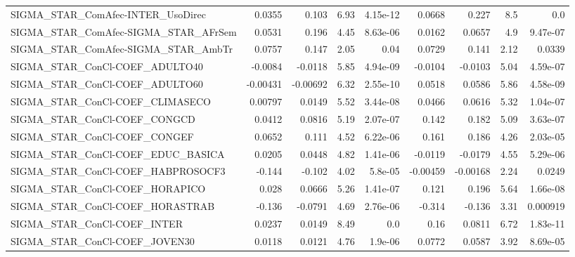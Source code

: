 \begin{tabular}{lrrrrrrrr}
SIGMA\_STAR\_ComAfec-INTER\_UsoDirec      &      0.0355 &        0.103 &     6.93 & 4.15e-12 &     0.0668 &       0.227 &          8.5 &           0.0 \\
SIGMA\_STAR\_ComAfec-SIGMA\_STAR\_AFrSem   &      0.0531 &        0.196 &     4.45 & 8.63e-06 &     0.0162 &      0.0657 &          4.9 &      9.47e-07 \\
SIGMA\_STAR\_ComAfec-SIGMA\_STAR\_AmbTr    &      0.0757 &        0.147 &     2.05 &     0.04 &     0.0729 &       0.141 &         2.12 &        0.0339 \\
SIGMA\_STAR\_ConCl-COEF\_ADULTO40         &     -0.0084 &      -0.0118 &     5.85 & 4.94e-09 &    -0.0104 &     -0.0103 &         5.04 &      4.59e-07 \\
SIGMA\_STAR\_ConCl-COEF\_ADULTO60         &    -0.00431 &     -0.00692 &     6.32 & 2.55e-10 &     0.0518 &      0.0586 &         5.86 &      4.58e-09 \\
SIGMA\_STAR\_ConCl-COEF\_CLIMASECO        &     0.00797 &       0.0149 &     5.52 & 3.44e-08 &     0.0466 &      0.0616 &         5.32 &      1.04e-07 \\
SIGMA\_STAR\_ConCl-COEF\_CONGCD           &      0.0412 &       0.0816 &     5.19 & 2.07e-07 &      0.142 &       0.182 &         5.09 &      3.63e-07 \\
SIGMA\_STAR\_ConCl-COEF\_CONGEF           &      0.0652 &        0.111 &     4.52 & 6.22e-06 &      0.161 &       0.186 &         4.26 &      2.03e-05 \\
SIGMA\_STAR\_ConCl-COEF\_EDUC\_BASICA      &      0.0205 &       0.0448 &     4.82 & 1.41e-06 &    -0.0119 &     -0.0179 &         4.55 &      5.29e-06 \\
SIGMA\_STAR\_ConCl-COEF\_HABPROSOCF3      &      -0.144 &       -0.102 &     4.02 &  5.8e-05 &   -0.00459 &    -0.00168 &         2.24 &        0.0249 \\
SIGMA\_STAR\_ConCl-COEF\_HORAPICO         &       0.028 &       0.0666 &     5.26 & 1.41e-07 &      0.121 &       0.196 &         5.64 &      1.66e-08 \\
SIGMA\_STAR\_ConCl-COEF\_HORASTRAB        &      -0.136 &      -0.0791 &     4.69 & 2.76e-06 &     -0.314 &      -0.136 &         3.31 &      0.000919 \\
SIGMA\_STAR\_ConCl-COEF\_INTER            &      0.0237 &       0.0149 &     8.49 &      0.0 &       0.16 &      0.0811 &         6.72 &      1.83e-11 \\
SIGMA\_STAR\_ConCl-COEF\_JOVEN30          &      0.0118 &       0.0121 &     4.76 &  1.9e-06 &     0.0772 &      0.0587 &         3.92 &      8.69e-05 \\

\end{tabular}
